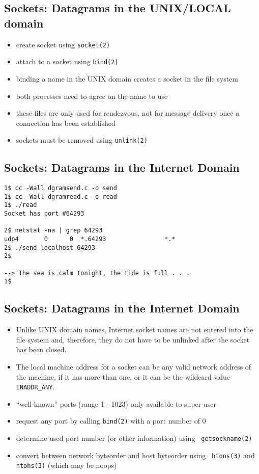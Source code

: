 \documentclass[xga]{xdvislides}
\begin{document}
\subsection{Sockets: Datagrams in the UNIX/LOCAL domain}
\begin{itemize}
	\item create socket using {\tt socket(2)}
	\item attach to a socket using {\tt bind(2)}
	\item binding a name in the UNIX domain creates a socket in the file system
	\item both processes need to agree on the name to use
	\item these files are only used for rendezvous, not for message delivery
		once a connection has been established
	\item sockets must be removed using {\tt unlink(2)}
\end{itemize}

\subsection{Sockets: Datagrams in the Internet Domain}
\begin{verbatim}
1$ cc -Wall dgramsend.c -o send
1$ cc -Wall dgramread.c -o read
1$ ./read
Socket has port #64293

2$ netstat -na | grep 64293
udp4       0      0  *.64293                *.*
2$ ./send localhost 64293
2$

--> The sea is calm tonight, the tide is full . . .
1$
\end{verbatim}
\vfill

\subsection{Sockets: Datagrams in the Internet Domain}
\begin{itemize}
	\item Unlike UNIX domain names, Internet socket names are not entered into
		the file system and, therefore, they do not have to be unlinked after the
		socket has been closed.
	\item The local machine address for a socket can be any valid network address
		of the machine, if it has more than one, or it can be the wildcard value
		{\tt INADDR\_ANY}.
	\item ``well-known'' ports (range 1 - 1023) only available to super-user
	\item request any port by calling {\tt bind(2)} with a port number of 0
	\item determine used port number (or other information) using {\tt
		getsockname(2)}
	\item convert between network byteorder and host byteorder using {\tt
		htons(3)} and {\tt ntohs(3)} (which may be noops)
\end{itemize}
\end{document}
